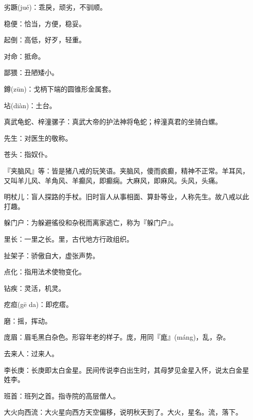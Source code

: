 \startbuffer[813]
劣蹶(jué)：乖戾，顽劣，不驯顺。
\stopbuffer


\startbuffer[814]
稳便：恰当，方便，稳妥。
\stopbuffer


\startbuffer[815]
起倒：高低，好歹，轻重。
\stopbuffer


\startbuffer[816]
对命：抵命。
\stopbuffer


\startbuffer[817]
鄙猥：丑陋矮小。
\stopbuffer


\startbuffer[818]
鐏(zūn)：戈柄下端的圆锥形金属套。
\stopbuffer


\startbuffer[819]
坫(diàn)：土台。
\stopbuffer


\startbuffer[820]
真武龟蛇、梓潼骡子：真武大帝的护法神将龟蛇；梓潼真君的坐骑白螺。
\stopbuffer


\startbuffer[821]
先生：对医生的敬称。
\stopbuffer


\startbuffer[822]
苍头：指奴仆。
\stopbuffer


\startbuffer[823]
『夹脑风』等：皆是猪八戒的玩笑语。夹脑风，傻而疯癫，精神不正常。羊耳风，又叫羊儿风、羊角风、羊癫风，即癫痫。大麻风，即麻风。头风，头痛。
\stopbuffer


\startbuffer[824]
明杖儿：盲人探路的手杖。旧时盲人从事相面、算卦等业，人称先生。故八戒以此打趣。
\stopbuffer


\startbuffer[825]
躲门户：为躲避徭役和杂税而离家逃亡，称为『躲门户』。
\stopbuffer


\startbuffer[826]
里长：一里之长。里，古代地方行政组织。
\stopbuffer


\startbuffer[827]
扯架子：骄傲自大，虚张声势。
\stopbuffer


\startbuffer[828]
点化：指用法术使物变化。
\stopbuffer


\startbuffer[829]
钻疾：灵活，机灵。
\stopbuffer


\startbuffer[830]
疙疸(gē da)：即疙瘩。
\stopbuffer


\startbuffer[831]
磨：摇，挥动。
\stopbuffer


\startbuffer[832]
庞眉：眉毛黑白杂色。形容年老的样子。庞，用同『庬』(máng)，乱，杂。
\stopbuffer


\startbuffer[833]
去来人：过来人。
\stopbuffer


\startbuffer[834]
李长庚：长庚即太白金星。民间传说李白出生时，其母梦见金星入怀，说太白金星姓李。
\stopbuffer


\startbuffer[835]
班首：班列之首。指寺院的高层僧人。
\stopbuffer


\startbuffer[836]
大火向西流：大火星向西方天空偏移，说明秋天到了。大火，星名。流，落下。
\stopbuffer


